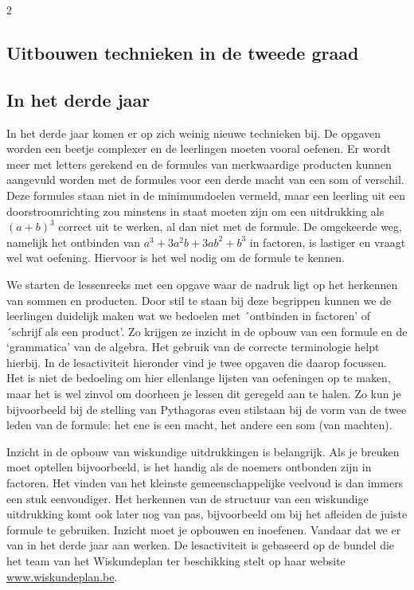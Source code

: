 \begin{multicols}{2}


\subsection{Uitbouwen technieken in de tweede graad}
\subsection*{In het derde jaar}
\label{q:efficientie}
In het derde jaar komen er op zich weinig nieuwe technieken bij. De opgaven worden een beetje complexer en de leerlingen moeten vooral oefenen. Er wordt meer met letters gerekend en de formules van merkwaardige producten kunnen aangevuld worden met de formules voor een derde macht van een som of verschil. Deze formules staan niet in de minimumdoelen vermeld, maar een leerling uit een doorstroomrichting zou minstens in staat moeten zijn om een uitdrukking als $(a+b)^3$ correct uit te werken, al dan niet met de formule. De omgekeerde weg, namelijk het ontbinden van $a^3+3a^2b+3ab^2+b^3$ in factoren, is lastiger en vraagt wel wat oefening. Hiervoor is het wel nodig om de formule te kennen. 

We starten de lessenreeks met een opgave waar de nadruk ligt op het herkennen van sommen en producten. Door stil te staan bij deze begrippen kunnen we de leerlingen duidelijk maken wat we bedoelen met ´ontbinden in factoren' of ´schrijf als een product'. Zo krijgen ze inzicht in de opbouw van een formule en de `grammatica' van de algebra. Het gebruik van de correcte terminologie helpt hierbij. In de lesactiviteit hieronder vind je twee opgaven die daarop focussen. Het is niet de bedoeling om hier ellenlange lijsten van oefeningen op te maken, maar het is wel zinvol om doorheen je lessen dit geregeld aan te halen. Zo kun je bijvoorbeeld bij de stelling van Pythagoras even stilstaan bij de vorm van de twee leden van de formule: het ene is een macht, het andere een som (van machten). 

Inzicht in de opbouw van wiskundige uitdrukkingen is belangrijk. Als je breuken moet optellen bijvoorbeeld, is het handig als de noemers ontbonden zijn in factoren. Het vinden van het kleinste gemeenschappelijke veelvoud is dan immers een stuk eenvoudiger. Het herkennen van de structuur van een wiskundige uitdrukking komt ook later nog van pas, bijvoorbeeld om bij het afleiden de juiste formule te gebruiken. Inzicht moet je opbouwen en inoefenen. Vandaar dat we er van in het derde jaar aan werken. De lesactiviteit is gebaseerd op de bundel die het team van het Wiskundeplan ter beschikking stelt op haar website \url{www.wiskundeplan.be}. 


\end{multicols}

